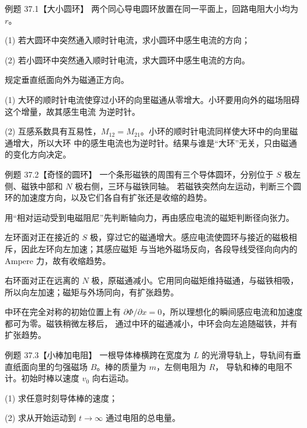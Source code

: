 \Needspace{0.12\textheight}
\begin{origexamplebox}{例题 37.1【大小圆环】}
两个同心导电圆环放置在同一平面上，回路电阻大小均为 $r$。

(1) 若大圆环中突然通入顺时针电流，求小圆环中感生电流的方向；

(2) 若小圆环中突然通入顺时针电流，求大圆环中感生电流的方向。
\end{origexamplebox}

\begin{xesolution}
规定垂直纸面向外为磁通正方向。

(1) 大环的顺时针电流使穿过小环的向里磁通从零增大。小环要用向外的磁场阻碍这个增量，故其感生电流
为逆时针。

(2) 互感系数具有互易性，$M_{12}=M_{21}$。小环的顺时针电流同样使大环中的向里磁通增大，所以大环
中的感生电流也为逆时针。结果与谁是“大环”无关，只由磁通的变化方向决定。

\concentricLoopsDiagram
\end{xesolution}

\Needspace{0.12\textheight}
\begin{origexamplebox}{例题 37.2【奇怪的圆环】}
一个条形磁铁的周围有三个导体圆环，分别位于 $S$ 极左侧、磁铁中部和 $N$ 极右侧，三环与磁铁同轴。
若磁铁突然向左运动，判断三个圆环的加速度方向，以及它们各自有扩张还是收缩的趋势。
\end{origexamplebox}

\begin{xesolution}
用“相对运动受到电磁阻尼”先判断轴向力，再由感应电流的磁矩判断径向张力。

左环面对正在接近的 $S$ 极，穿过它的磁通增大。感应电流使圆环与接近的磁极相斥，因此左环向左加速；其感应磁矩
与当地外磁场反向，各段导线受径向向内的 Ampere 力，故有收缩趋势。

右环面对正在远离的 $N$ 极，原磁通减小。它用同向磁矩维持磁通，与磁铁相吸，所以向左加速；磁矩与外场同向，有扩张趋势。

中环在完全对称的初始位置上有 $\partial\Phi/\partial x=0$，所以理想化的瞬间感应电流和加速度都可为零。磁铁稍微左移后，
通过中环的磁通减小，中环会向左追随磁铁，并有扩张趋势。

\magnetThreeLoopsDiagram
\end{xesolution}

\Needspace{0.12\textheight}
\begin{origexamplebox}{例题 37.3【小棒加电阻】}
一根导体棒横跨在宽度为 $L$ 的光滑导轨上，导轨间有垂直纸面向里的匀强磁场 $B$。棒的质量为 $m$，左侧电阻为 $R$，
导轨和棒的电阻不计。初始时棒以速度 $v_0$ 向右运动。

(1) 求任意时刻导体棒的速度；

(2) 求从开始运动到 $t\to\infty$ 通过电阻的总电量。
\end{origexamplebox}

